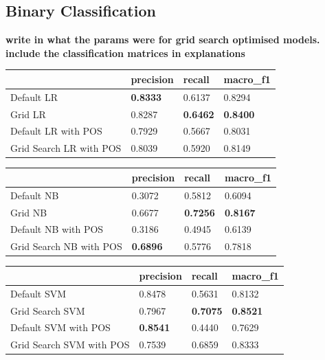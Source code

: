 \documentclass[conference]{IEEEtran}
\begin{document}
\subsection{Binary Classification}
\textbf{write in what the params were for grid search optimised models.}
\textbf{include the classification matrices in explanations}
\begin{table}[H]
\begin{tabular}{|l|l|l|l|}
\hline
                        & precision & recall & macro\_f1 \\ \hline
Default LR              & \textbf{0.8333} & 0.6137 & 0.8294 \\ \hline
Grid LR                 & 0.8287 & \textbf{0.6462} & \textbf{0.8400} \\ \hline
Default LR with POS     & 0.7929 & 0.5667 & 0.8031 \\ \hline
Grid Search LR with POS & 0.8039 & 0.5920 & 0.8149 \\ \hline
\end{tabular}
\end{table}

\begin{table}[h]
\begin{tabular}{|l|l|l|l|}
\hline
                        & precision & recall & macro\_f1 \\ \hline
Default NB              & 0.3072 & 0.5812 & 0.6094 \\ \hline
Grid NB                 & 0.6677 & \textbf{0.7256} & \textbf{0.8167} \\ \hline
Default NB with POS     & 0.3186 & 0.4945 & 0.6139 \\ \hline
Grid Search NB with POS & \textbf{0.6896} & 0.5776 & 0.7818 \\ \hline
\end{tabular}
\end{table}

\begin{table}[h]
\begin{tabular}{|l|l|l|l|}
\hline
                         & precision & recall & macro\_f1 \\ \hline
Default SVM              & 0.8478 & 0.5631 & 0.8132 \\ \hline
Grid Search SVM          & 0.7967 & \textbf{0.7075} & \textbf{0.8521} \\ \hline
Default SVM with POS     & \textbf{0.8541} & 0.4440 & 0.7629 \\ \hline
Grid Search SVM with POS & 0.7539 & 0.6859 & 0.8333 \\ \hline
\end{tabular}
\end{table}
\end{document}
